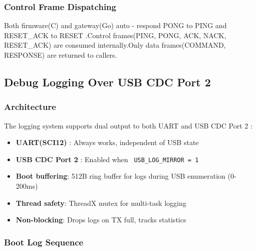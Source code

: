 \subsubsection{Control Frame Dispatching}

    Both
    firmware(C) and
    gateway(Go) auto - respond PONG to PING and RESET\_ACK to RESET
                           .Control
                       frames(PING, PONG, ACK, NACK,
                              RESET\_ACK) are consumed internally.Only data
                       frames(COMMAND, RESPONSE)
are returned to callers.

\subsection{Debug Logging Over USB CDC Port 2
}

\subsubsection{Architecture}

The logging system supports dual output to both UART and USB CDC Port 2 :

\begin{itemize}
\item \textbf{UART(SCI12)} : Always works, independent of USB state
\item \textbf{USB CDC Port 2} : Enabled when \texttt {
  USB\_LOG\_MIRROR = 1
}
\item \textbf{Boot buffering}: 512B ring buffer for logs during USB enumeration (0-200ms)
\item \textbf{Thread safety}: ThreadX mutex for multi-task logging
\item \textbf{Non-blocking}: Drops logs on TX full, tracks statistics
\end{itemize}

\subsubsection{Boot Log Sequence}

